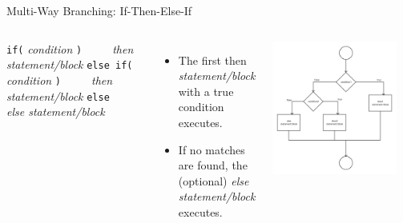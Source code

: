 \documentclass[handout]{beamer}
\begin{document}
\begin{frame}[fragile]{Multi-Way Branching: If-Then-Else-If}
\begin{columns}
    \verb!if(! \textit{condition} \verb!)! 
    \newline\verb!    ! \textit{then statement/block}
    \verb!else if(! \textit{condition} \verb!)! 
    \newline\verb!    ! \textit{then statement/block}
    \newline\verb!else!
    \newline\verb!    ! \textit{else statement/block}
    
    \vspace{0.5cm}

    \begin{itemize}[<+(1)->]
        \item The first then \textit{statement/block} with a true condition executes.
        \item If no matches are found, the (optional) \textit{else statement/block} executes.
    \end{itemize}

    \includegraphics[width=0.9\textwidth]{images/if-elseif}
\end{columns}
\end{frame}
\end{document}
